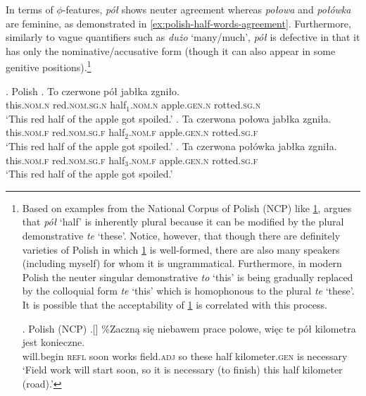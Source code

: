 In terms of $\phi$-features, \textit{pół} shows neuter agreement whereas \textit{połowa} and \textit{połówka} are feminine, as demonstrated in \ref{ex:polish-half-words-agreement}. Furthermore, similarly to vague quantifiers such as \textit{dużo} `many/much', \textit{pół} is defective in that it has only the nominative/accusative form (though it can also appear in some genitive positions).\footnote{\label{fn:plural-pol}Based on examples from the National Corpus of Polish (NCP) like \ref{ex:inherent-plural}, \citet{przepiorkowski2006inherentnej} argues that \textit{pół} `half' is inherently plural because it can be modified by the plural demonstrative \textit{te} `these'. Notice, however, that though there are definitely varieties of Polish in which \ref{ex:inherent-plural} is well-formed, there are also many speakers (including myself) for whom it is ungrammatical. Furthermore, in modern Polish the neuter singular demonstrative \textit{to} `this' is being gradually replaced by the colloquial form \textit{te} `this' which is homophonous to the plural \textit{te} `these'. It is possible that the acceptability of \ref{ex:inherent-plural} is correlated with this process.

\ex. Polish (NCP)
\bg.[] \%Zaczną się niebawem prace polowe, więc te pół kilometra jest konieczne.\\
will.begin \textsc{refl} soon works field.\textsc{adj} so these half kilometer.\textsc{gen} is necessary\\
`Field work will start soon, so it is necessary (to finish) this half kilometer (road).'\label{ex:inherent-plural}

}\largerpage[2]

\ex. Polish\label{ex:polish-half-words-agreement}
\ag. To czerwone pół jabłka zgniło.\\
this\textsc{.nom.n} red\textsc{.nom.sg.n} half$_{1}$\textsc{.nom.n} apple\textsc{.gen.n} rotted\textsc{.sg.n}\\
`This red half of the apple got spoiled.'
\bg. Ta czerwona połowa jabłka zgniła.\\
this\textsc{.nom.f} red\textsc{.nom.sg.f} half$_{2}$\textsc{.nom.f} apple\textsc{.gen.n} rotted\textsc{.sg.f}\\
`This red half of the apple got spoiled.'
\bg. Ta czerwona połówka jabłka zgniła.\\
this\textsc{.nom.f} red\textsc{.nom.sg.f} half$_{3}$\textsc{.nom.f} apple\textsc{.gen.n} rotted\textsc{.sg.f}\\
`This red half of the apple got spoiled.'

